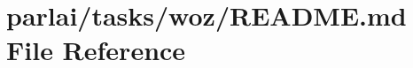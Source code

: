 \hypertarget{parlai_2tasks_2woz_2README_8md}{}\section{parlai/tasks/woz/\+R\+E\+A\+D\+ME.md File Reference}
\label{parlai_2tasks_2woz_2README_8md}
